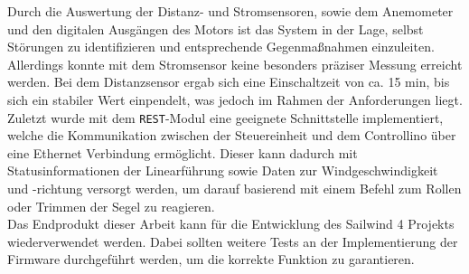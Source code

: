 \noindent
Durch die Auswertung der Distanz- und Stromsensoren, sowie dem Anemometer und den digitalen Ausgängen des Motors ist das System in der Lage, selbst Störungen zu identifizieren und entsprechende Gegenmaßnahmen einzuleiten. Allerdings konnte mit dem Stromsensor keine besonders präziser Messung erreicht werden. Bei dem Distanzsensor ergab sich eine Einschaltzeit von ca. 15 min, bis sich ein stabiler Wert einpendelt, was jedoch im Rahmen der Anforderungen liegt.\\

\noindent
Zuletzt wurde mit dem \texttt{REST}-Modul eine geeignete Schnittstelle implementiert, welche die Kommunikation zwischen der Steuereinheit und dem Controllino über eine Ethernet Verbindung ermöglicht. Dieser kann dadurch mit Statusinformationen der Linearführung sowie Daten zur Windgeschwindigkeit und -richtung versorgt werden, um darauf basierend mit einem Befehl zum Rollen oder Trimmen der Segel zu reagieren. \\

\noindent
Das Endprodukt dieser Arbeit kann für die Entwicklung des Sailwind 4 Projekts wiederverwendet werden. Dabei sollten weitere Tests an der Implementierung der Firmware durchgeführt werden, um die korrekte Funktion zu garantieren.

